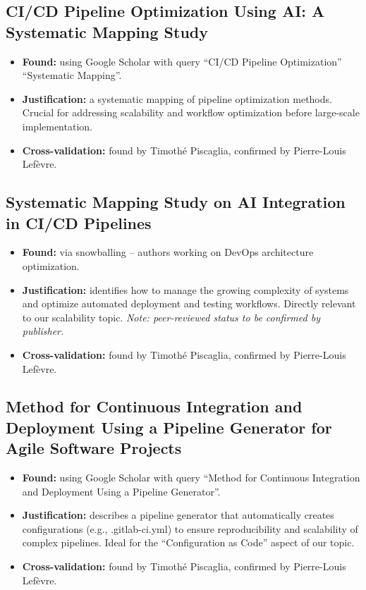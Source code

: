 \documentclass[a4paper,11pt,oneside]{article}
\begin{document}
\subsection{CI/CD Pipeline Optimization Using AI: A Systematic Mapping Study \cite{Dutta2025}}
%
\begin{itemize}
    \item \textbf{Found:} using Google Scholar with query ``CI/CD Pipeline Optimization'' ``Systematic Mapping''.
    \item \textbf{Justification:} a systematic mapping of pipeline optimization methods. Crucial for addressing scalability and workflow optimization before large-scale implementation.
    \item \textbf{Cross-validation:} found by Timoth\'{e} Piscaglia, confirmed by Pierre-Louis Lef\`{e}vre.
\end{itemize}

\subsection{Systematic Mapping Study on AI Integration in CI/CD Pipelines \cite{Ullah2025}}
%
\begin{itemize}
    \item \textbf{Found:} via snowballing -- authors working on DevOps architecture optimization.
    \item \textbf{Justification:} identifies how to manage the growing complexity of systems and optimize automated deployment and testing workflows. Directly relevant to our scalability topic. \textit{Note: peer-reviewed status to be confirmed by publisher.}
    \item \textbf{Cross-validation:} found by Timoth\'{e} Piscaglia, confirmed by Pierre-Louis Lef\`{e}vre.
\end{itemize}

\subsection{Method for Continuous Integration and Deployment Using a Pipeline Generator for Agile Software Projects \cite{Layman2022}}
%
\begin{itemize}
    \item \textbf{Found:} using Google Scholar with query ``Method for Continuous Integration and Deployment Using a Pipeline Generator''.
    \item \textbf{Justification:} describes a pipeline generator that automatically creates configurations (e.g., .gitlab-ci.yml) to ensure reproducibility and scalability of complex pipelines. Ideal for the ``Configuration as Code'' aspect of our topic.
    \item \textbf{Cross-validation:} found by Timoth\'{e} Piscaglia, confirmed by Pierre-Louis Lef\`{e}vre.
\end{itemize}
\end{document}
